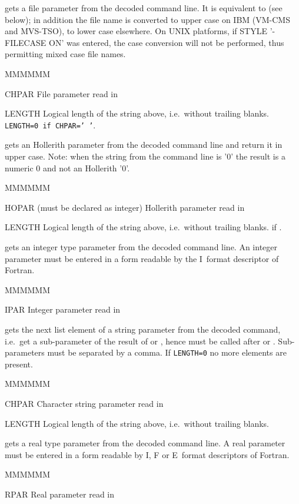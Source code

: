 \Action gets a file parameter from the
decoded command line.
It is equivalent to  (see below); in addition
the file name is converted to upper case on IBM (VM-CMS and MVS-TSO),
to lower case elsewhere.
On UNIX platforms, if STYLE '-FILECASE ON' was entered,
the case conversion will not be performed,
thus permitting mixed case file names.
\Pdesc\begin{DLtt}{MMMMMM}
\item[CHPAR] File parameter read in
\item[LENGTH] Logical length of the string above, i.e.\ without
trailing blanks.
{\tt LENGTH=0 if CHPAR=' '}.
\end{DLtt}

\Action gets an Hollerith parameter from the
decoded command line and return it in upper case.
Note: when the string from the command line is '0' the result is a numeric 0
and not an Hollerith '0'.
\Pdesc\begin{DLtt}{MMMMMM}
\item[HOPAR (must be declared as integer)] Hollerith parameter read in
\item[LENGTH] Logical length of the string above, i.e.\ without
trailing blanks.
 if .
\end{DLtt}

\Action gets an integer type parameter from the
decoded command line.
An integer parameter
must be entered in a form readable by the I~format descriptor of Fortran.
\Pdesc\begin{DLtt}{MMMMMM}
\item[IPAR] Integer parameter read in
\end{DLtt}

\Action gets the next list element of a string parameter from the
decoded command,
i.e.\ get a sub-parameter of the result of  or ,
hence  must be called after  or .
Sub-parameters must be separated by a comma.
If {\tt LENGTH=0} no more elements are present.
\Pdesc\begin{DLtt}{MMMMMM}
\item[CHPAR] Character string parameter read in
\item[LENGTH] Logical length of the string above, i.e.\ without
trailing blanks.
\end{DLtt}

\Action gets a real type parameter from the
decoded command line.
A real parameter
must be entered in a form readable by I, F or E~format descriptors of Fortran.
\Pdesc\begin{DLtt}{MMMMMM}
\item[RPAR] Real parameter read in
\end{DLtt}

